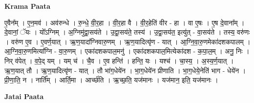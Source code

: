 \documentclass[17pt]{extarticle}
\begin{document}
\textbf{Krama Paata} \newline

ए॒वैन᳚म् । ए॒न॒मव॑ । अव॑रुन्धे । रु॒न्धे॒ वी॒र॒हा । वी॒र॒हा वै । वी॒र॒हेति॑ वीर - हा । वा ए॒षः । ए॒ष दे॒वाना᳚म् । दे॒वानां॒ ॅयः । यो᳚ऽग्निम् । अ॒ग्निमु॑द्वा॒सय॑ते । उ॒द्वा॒सय॑ते॒ तस्य॑ । उ॒द्वा॒सय॑त॒ इत्यु॑त् - वा॒सय॑ते । तस्य॒ वरु॑णः । वरु॑ण ए॒व । ए॒वर्ण॒यात् । ऋ॒ण॒यादा᳚ग्निवारु॒णम् । ऋ॒ण॒यादित्यृ॑ण - यात् । आ॒ग्नि॒वा॒रु॒णमेका॑दशकपालम् । आ॒ग्नि॒वा॒रु॒णमित्या᳚ग्नि - वा॒रु॒णम् । एका॑दशकपाल॒मनु॑ । एका॑दशकपाल॒मित्येका॑दश - क॒पा॒ल॒म् । अनु॒ निः । निर् व॑पेत् । व॒पे॒द् यम् । यम् च॑ । चै॒व । ए॒व हन्ति॑ । हन्ति॒ यः । यश्च॑ । चा॒स्य॒ । अ॒स्य॒र्ण॒यात् । ऋ॒ण॒यात् तौ । ऋ॒ण॒यादित्यृ॑ण - यात् । तौ भा॑ग॒धेये॑न । भा॒ग॒धेये॑न प्रीणाति । भा॒ग॒धेये॒नेति॑ भाग - धेये॑न । प्री॒णा॒ति॒ न । नार्ति᳚म् । आर्ति॒मा । आर्च्छ॑ति । ऋ॒च्छ॒ति॒ यज॑मानः । यज॑मान॒ इति॒ यज॑मानः । \newline

\textbf{Jatai Paata} \newline
\end{document}
